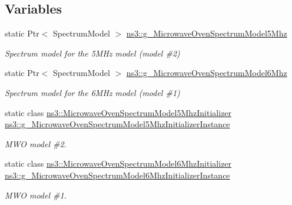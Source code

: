 \subsection*{Variables}
\begin{DoxyCompactItemize}
\item 
static Ptr$<$ Spectrum\+Model $>$ \hyperlink{namespacens3_ace6768337a854314ae7b25dde4253776}{ns3\+::g\+\_\+\+Microwave\+Oven\+Spectrum\+Model5\+Mhz}
\begin{DoxyCompactList}\small\item\em Spectrum model for the 5\+M\+Hz model (model \#2) \end{DoxyCompactList}\item 
static Ptr$<$ Spectrum\+Model $>$ \hyperlink{namespacens3_a6b509b98b71ad13653641d61a3df30c6}{ns3\+::g\+\_\+\+Microwave\+Oven\+Spectrum\+Model6\+Mhz}
\begin{DoxyCompactList}\small\item\em Spectrum model for the 6\+M\+Hz model (model \#1) \end{DoxyCompactList}\item 
static class \hyperlink{classns3_1_1MicrowaveOvenSpectrumModel5MhzInitializer}{ns3\+::\+Microwave\+Oven\+Spectrum\+Model5\+Mhz\+Initializer} \hyperlink{group__spectrum_ga5073cbf9e00712117f2d24d81740a34c}{ns3\+::g\+\_\+\+Microwave\+Oven\+Spectrum\+Model5\+Mhz\+Initializer\+Instance}
\begin{DoxyCompactList}\small\item\em M\+WO model \#2. \end{DoxyCompactList}\item 
static class \hyperlink{classns3_1_1MicrowaveOvenSpectrumModel6MhzInitializer}{ns3\+::\+Microwave\+Oven\+Spectrum\+Model6\+Mhz\+Initializer} \hyperlink{group__spectrum_gaca1a04ae288bb360e6c5974c1161dd08}{ns3\+::g\+\_\+\+Microwave\+Oven\+Spectrum\+Model6\+Mhz\+Initializer\+Instance}
\begin{DoxyCompactList}\small\item\em M\+WO model \#1. \end{DoxyCompactList}\end{DoxyCompactItemize}
